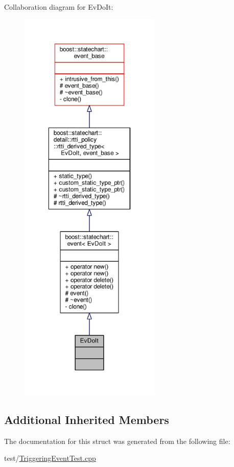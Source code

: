 Collaboration diagram for Ev\+Do\+It\+:
\nopagebreak
\begin{figure}[H]
\begin{center}
\leavevmode
\includegraphics[height=550pt]{struct_ev_do_it__coll__graph}
\end{center}
\end{figure}
\subsection*{Additional Inherited Members}


The documentation for this struct was generated from the following file\+:\begin{DoxyCompactItemize}
\item 
test/\mbox{\hyperlink{_triggering_event_test_8cpp}{Triggering\+Event\+Test.\+cpp}}\end{DoxyCompactItemize}
